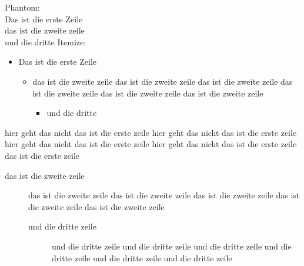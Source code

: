 \documentclass[11pt, a4paper, landscape]{article}
\begin{document}
\NewPage{}
\vfill
Phantom: \\
Das ist die erste Zeile\\
\phantom{Das ist die erste Zeile} das ist die zweite zeile\\
\phantom{Das ist die erste Zeile das ist die zweite zeile} und die dritte
\vfill
Itemize:\\
\begin{itemize}
  \setlength{\itemsep}{3ex}
  \setlength{\leftmargini}{5em}   
  \setlength{\leftmarginii}{10em}  
  \setlength{\leftmarginiii}{-15em}
\item Das ist die erste Zeile
  \begin{itemize}
  \item das ist die zweite zeile das ist die zweite zeile das ist die zweite zeile das ist die zweite zeile das ist die zweite zeile das ist die zweite zeile
    \begin{itemize}
    \item und die dritte
    \end{itemize}
  \end{itemize}
\end{itemize}
\vfill

\NewPage{}
\vfill
\begin{description}
  \setlength{\itemsep}{3ex}
  \setlength{\leftmargini}{-5em}   
  \setlength{\leftmarginii}{-5em}  
  \setlength{\leftmarginiii}{-5em}
\item[Das ist die erste Zeile] hier geht das nicht das ist die erste
  zeile hier geht das nicht das ist die erste zeile hier geht das
  nicht das ist die erste zeile hier geht das nicht das ist die erste
  zeile das ist die erste zeile
  \begin{description}
  \item[das ist die zweite zeile] das ist die zweite zeile das ist die
    zweite zeile das ist die zweite zeile das ist die zweite zeile das
    ist die zweite zeile
    \begin{description}
    \item[und die dritte zeile] und die dritte zeile und die dritte
      zeile und die dritte zeile und die dritte zeile und die dritte
      zeile und die dritte zeile
    \end{description}
  \end{description}
\end{description}
\vfill
\end{document}
